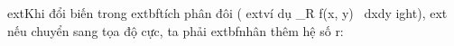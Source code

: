 \documentclass[preview]{standalone}
\begin{document}
\begin{center}
ext{Khi đổi biến trong } 	extbf{tích phân đôi} \big(	ext{ví dụ } \iint_R f(x, y) \, dxdy 
ight), 	ext{ nếu chuyển sang tọa độ cực, ta phải } 	extbf{nhân thêm hệ số } r:
\end{center}
\end{document}
